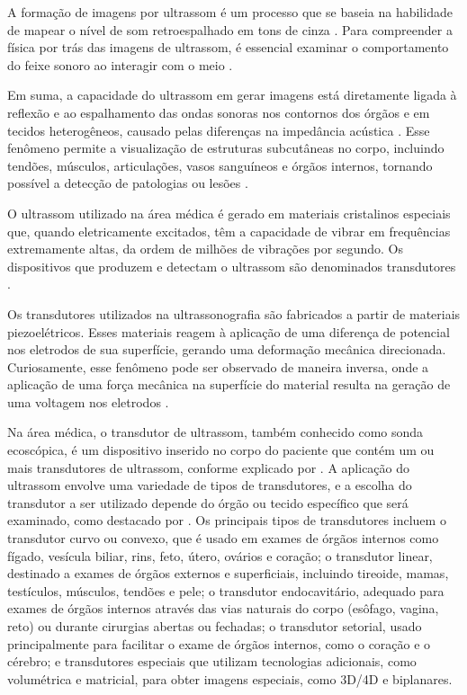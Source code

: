  A formação de imagens por ultrassom é um processo  que se baseia na habilidade de mapear o nível de som retroespalhado em tons de cinza \cite{49500}. Para compreender a física por trás das imagens de ultrassom, é essencial examinar o comportamento do feixe sonoro ao interagir com o meio \cite{Papalo2019}.

Em suma, a capacidade do ultrassom em gerar imagens está diretamente ligada à reflexão e ao espalhamento das ondas sonoras nos contornos dos órgãos e em tecidos heterogêneos, causado pelas diferenças na impedância acústica \cite{Papalo2019}. Esse fenômeno permite a visualização de estruturas subcutâneas no corpo, incluindo tendões, músculos, articulações, vasos sanguíneos e órgãos internos, tornando possível a detecção de patologias ou lesões \cite{Papalo2019}.

 O ultrassom utilizado na área médica é gerado em materiais cristalinos especiais que, quando eletricamente excitados, têm a capacidade de vibrar em frequências extremamente altas, da ordem de milhões de vibrações por segundo. Os dispositivos que produzem e detectam o ultrassom são denominados transdutores \cite{ISBN9241592990}.

Os transdutores utilizados na ultrassonografia são fabricados a partir de materiais piezoelétricos. Esses materiais reagem à aplicação de uma diferença de potencial nos eletrodos de sua superfície, gerando uma deformação mecânica direcionada. Curiosamente, esse fenômeno pode ser observado de maneira inversa, onde a aplicação de uma força mecânica na superfície do material resulta na geração de uma voltagem nos eletrodos \cite{biscegli_2003}.


Na área médica, o transdutor de ultrassom, também conhecido como sonda ecoscópica, é um dispositivo inserido no corpo do paciente que contém um ou mais transdutores de ultrassom, conforme explicado por \textcite{Carovac2011}. A aplicação do ultrassom envolve uma variedade de tipos de transdutores, e a escolha do transdutor a ser utilizado depende do órgão ou tecido específico que será examinado, como destacado por \textcite{ufersa}. Os principais tipos de transdutores incluem o transdutor curvo ou convexo, que é usado em exames de órgãos internos como fígado, vesícula biliar, rins, feto, útero, ovários e coração; o transdutor linear, destinado a exames de órgãos externos e superficiais, incluindo tireoide, mamas, testículos, músculos, tendões e pele; o transdutor endocavitário, adequado para exames de órgãos internos através das vias naturais do corpo (esôfago, vagina, reto) ou durante cirurgias abertas ou fechadas; o transdutor setorial, usado principalmente para facilitar o exame de órgãos internos, como o coração e o cérebro; e transdutores especiais que utilizam tecnologias adicionais, como volumétrica e matricial, para obter imagens especiais, como 3D/4D e biplanares.


